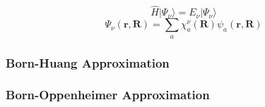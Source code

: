 \documentclass[9pt]{report}
\begin{document}
\begin{equation}
\hat{H}|\Psi_{\nu}\rangle = E_{\nu}|\Psi_{\nu}\rangle
\end{equation}
\begin{equation}
\Psi_{\nu}(\boldsymbol{r},\boldsymbol{R}) = \sum_{a}\chi_{a}^{\nu}(\boldsymbol{R})\psi_{a}(\boldsymbol{r},\boldsymbol{R})
\end{equation}






\subsubsection{Born-Huang Approximation}
\subsubsection{Born-Oppenheimer Approximation}
\end{document}
